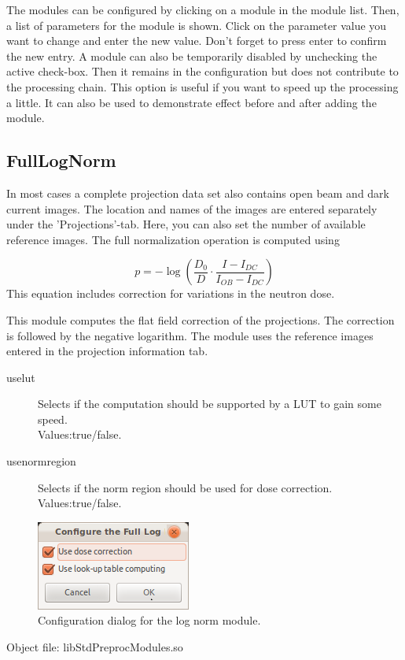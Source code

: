 \documentclass[a4paper]{scrreprt}
\begin{document}
The modules can be configured by clicking on a module in the module list. Then,
a list of parameters for the module is shown. Click on the parameter value you
want to change and enter the new value. Don't forget to press enter to confirm
the new entry. A module can also be temporarily disabled by unchecking the
active check-box. Then it remains in the configuration but does not contribute
to the processing chain. This option is useful if you want to speed up the
processing a little. It can also be used to demonstrate effect before and after
adding the module.

\subsection{FullLogNorm}
In most cases a complete projection data set also contains open beam and dark
current images. The location and names of the images are entered separately
under the 'Projections'-tab. Here, you can also set the number of available
reference images. The full normalization operation is computed using

\begin{equation}
p=-\log\left(\frac{D_0}{D}\cdot\frac{I-I_{DC}}{I_{OB}-I_{DC}}\right)
\end{equation}
This equation includes correction for variations in the neutron dose.

This module computes the flat field correction of the projections. The
correction is followed by the negative logarithm. The module uses the reference
images entered in the projection information tab.
\begin{description}
 \item[uselut] Selects if the computation should be
supported by a LUT to gain some speed. \\Values:true/false.
\item[usenormregion] Selects if the norm region should be used for dose
correction. \\Values:true/false.
\end{description}
\begin{figure}[ht!]
\centering
\includegraphics[scale=0.5]{figures/ConfigLogNorm.png}
\caption{Configuration dialog for the log norm module.}
\end{figure}
Object file: libStdPreprocModules.so
\end{document}
